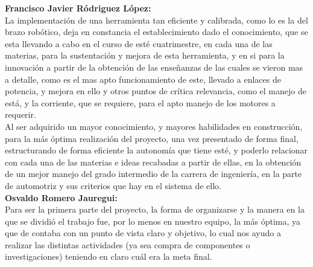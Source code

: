 \documentclass[14pt,a4paper]{article}
\begin{document}
\textbf{Francisco Javier Ródriguez López:}\\
La implementación de una herramienta tan eficiente y calibrada, como lo es la del brazo robótico, deja en constancia el establecimiento dado el conocimiento, que se esta llevando a cabo en el curso de esté cuatrimestre, en cada una de las materias, para la sustentación y mejora de esta herramienta, y en si para la innovación a partir de la obtención de las enseñanzas de las cuales se vieron mas a detalle, como es el mas apto funcionamiento de este, llevado a enlaces de potencia, y mejora en ello y otros puntos de crítica relevancia, como el manejo de está, y la corriente, que se requiere, para el apto manejo de los motores a requerir.\\
Al ser adquirido un mayor conocimiento, y mayores habilidades en construcción, para la más óptima realización del proyecto, una vez presentado de forma final, estructurando de forma eficiente la autonomía que tiene esté, y poderlo relacionar con cada una de las materias e ideas recabadas a partir de ellas, en la obtención de un mejor manejo del grado intermedio de la carrera de ingeniería, en la parte de automotriz y sus criterios que hay en el sistema de ello.\\

\textbf{Osvaldo Romero Jauregui:}\\
Para ser la primera parte del proyecto, la forma de organizarse y la manera en la que se dividió el trabajo fue, por lo menos en nuestro equipo, la más óptima, ya que de contaba con un punto de vista claro y objetivo, lo cual nos ayudo a realizar las distintas actividades (ya sea compra de componentes o investigaciones) teniendo en claro cuál era la meta final.

\newpage



\end{document}
